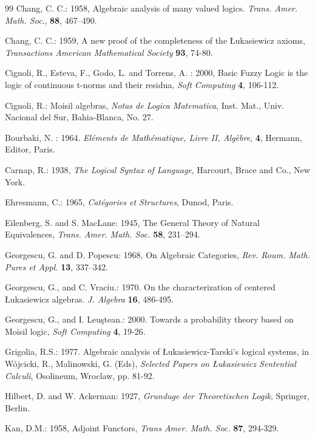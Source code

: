 \documentclass[12pt]{article}
\theoremstyle{plain}
\theoremstyle{definition}
\begin{document}
\begin{thebibliography} {99}
Chang, C. C.: 1958, Algebraic analysis of many valued logics. \emph{Trans. Amer. Math. Soc}., \textbf{88},
467--490.

Chang, C. C.: 1959, A new proof of the completeness of the \L{}ukasiewicz axioms, \emph{Transactions American
Mathematical Society} \textbf{93}, 74-80.

Cignoli, R., Esteva, F., Godo, L. and Torrens, A. : 2000, Basic Fuzzy Logic is the logic of continuous t-norms
and their residua, \emph{Soft Computing} \textbf{4}, 106-112.

Cignoli, R.: Moisil algebras, \emph{Notas de Logica Matematica}, Inst. Mat., Univ. Nacional del Sur,
Bahia-Blanca, No. 27.

Bourbaki, N. : 1964. \emph{El\'ements de Math\'ematique, Livre II, Alg\`ebre}, \textbf{4}, Hermann, Editor,
Paris.

Carnap, R.: 1938, \emph{The Logical Syntax of Language}, Harcourt, Brace and Co., New York.

Ehresmann, C.: 1965, \emph{Cat\'egories et Structures}, Dunod, Paris.

Eilenberg, S. and S. MacLane: 1945, The General Theory of Natural Equivalences, \emph{Trans. Amer. Math. Soc.}
\textbf{58}, 231--294.

Georgescu, G. and D. Popescu: 1968, On Algebraic Categories, \emph{Rev. Roum. Math. Pures et Appl.}
\textbf{13}, 337--342.

Georgescu, G., and C. Vraciu.: 1970. On the characterization of centered \L{}ukasiewicz algebras. 
\emph{J. Algebra} \textbf{16}, 486-495.

Georgescu, G., and I. Leu\c stean.: 2000. Towards a probability theory based on Moisil logic, \emph{Soft
Computing} \textbf{4}, 19-26.

Grigolia, R.S.: 1977. Algebraic analysis of \L ukasiewicz-Tarski's logical systems, in W\'{o}jcicki, R.,
Malinowski, G. (Eds), \emph{Selected Papers on \L ukasiewicz Sentential Calculi}, Osolineum, Wroclaw, pp. 81-92.

Hilbert, D. and W. Ackerman: 1927, \emph{Grunduge der Theoretischen Logik}, Springer, Berlin.

Kan, D.M.: 1958, Adjoint Functors, \emph{Trans Amer. Math. Soc.} \textbf{87}, 294-329.


\end{thebibliography}
\end{document}

